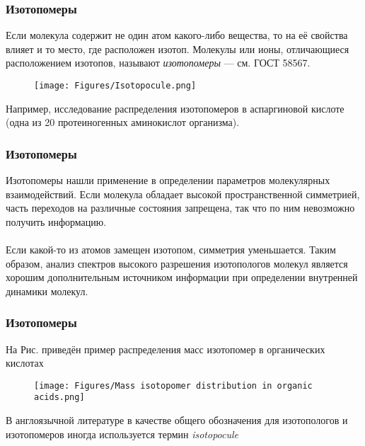 \begin{frame}
\frametitle{Изотопомеры}

Если молекула содержит не один атом какого-либо вещества, то на её свойства влияет и то место, где расположен изотоп. Молекулы или ионы, отличающиеся расположением изотопов, называют \emph{изотопомеры} --- см. ГОСТ 58567.

\begin{figure}[ht] 
	\centering\small
	\texttt{[image: Figures/Isotopocule.png]}
	\label{f:Isotopocule}
\end{figure}

Например, исследование распределения изотопомеров в аспаргиновой кислоте (одна из 20 протеиногенных аминокислот организма). 



\end{frame}





\begin{frame}
\frametitle{Изотопомеры}
Изотопомеры нашли применение в определении параметров молекулярных взаимодействий.
Если молекула обладает высокой пространственной симметрией, часть переходов на различные состояния запрещена, так что по ним невозможно получить информацию.\\
~\\

Если какой-то из атомов замещен изотопом, симметрия уменьшается. Таким образом, анализ спектров высокого разрешения изотопологов молекул является хорошим дополнительным источником информации при определении внутренней динамики молекул. 

\end{frame}


\begin{frame}
\frametitle{Изотопомеры}
На Рис. приведён пример распределения масс изотопомер в органических кислотах  
\begin{figure}[ht] 
	\centering\small
	\texttt{[image: Figures/Mass isotopomer distribution in organic acids.png]}
	\label{f:MassIsotopomerOrganicAcids}
\end{figure}

В англоязычной литературе в качестве общего обозначения для изотопологов и изотопомеров иногда используется термин \emph{isotopocule}
\end{frame}

